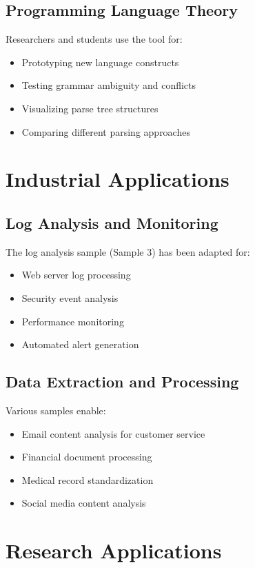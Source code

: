 \documentclass[a4paper,12pt]{report}
\begin{document}
\subsection{Programming Language Theory}
Researchers and students use the tool for:
\begin{itemize}
    \item Prototyping new language constructs
    \item Testing grammar ambiguity and conflicts
    \item Visualizing parse tree structures
    \item Comparing different parsing approaches
\end{itemize}

\section{Industrial Applications}

\subsection{Log Analysis and Monitoring}
The log analysis sample (Sample 3) has been adapted for:
\begin{itemize}
    \item Web server log processing
    \item Security event analysis
    \item Performance monitoring
    \item Automated alert generation
\end{itemize}

\subsection{Data Extraction and Processing}
Various samples enable:
\begin{itemize}
    \item Email content analysis for customer service
    \item Financial document processing
    \item Medical record standardization
    \item Social media content analysis
\end{itemize}

\section{Research Applications}
\end{document}
